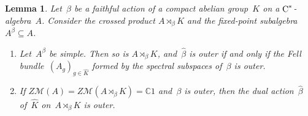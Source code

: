\documentclass[a4paper]{amsart}
\theoremstyle{plain}
\newtheorem{lemma}[theorem]{Lemma}
\theoremstyle{definition}
\theoremstyle{remark}
\numberwithin{theorem}{section}
\numberwithin{equation}{section}
\newcommand*{\nb}{\nobreakdash}
\newcommand*{\C}{\mathbb C}
\newcommand*{\Cst}{\textup C^*}%
\newcommand*{\Mult}{\mathcal M}%
\begin{document}
\begin{lemma}
  \label{lem:abelian_actions}
  Let~\(\beta\) be a faithful action of a compact abelian group~\(K\)
  on a \(\Cst\)\nb-algebra~\(A\).
  Consider the crossed product \(A\rtimes_\beta K\) and the
  fixed-point subalgebra \(A^\beta\subseteq A\).
  \begin{enumerate}
  \item \label{enu:abelian_actions2}%
    Let~\(A^\beta\) be simple.  Then so is \(A\rtimes_\beta K\),
    and~\(\widehat{\beta}\) is outer if and only if the Fell
    bundle~\((A_g)_{g\in \widehat{K}}\) formed by the spectral
    subspaces of~\(\beta\) is outer.
  \item \label{enu:abelian_actions1}%
    If \(Z\Mult(A) = Z\Mult(A\rtimes_\beta K)=\C 1\) and~\(\beta\) is
    outer, then the dual action~\(\widehat{\beta}\) of~\(\widehat{K}\)
    on~\(A\rtimes_\beta K\) is outer.
  \end{enumerate}
\end{lemma}
\end{document}
